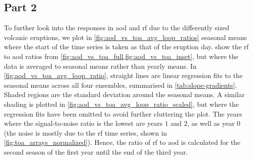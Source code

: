 \documentclass{ametsocV5}
\begin{document}

\subsection{Part 2}

To further look into the responses in \ac{aod} and \ac{rf} due to the differently sized
volcanic eruptions, we plot in \cref{fig:aod_vs_toa_avg_loop_ratios} seasonal means
where the start of the time series is taken as that of the eruption day.
 show the
\ac{rf} to \ac{aod} ratios from \cref{fig:aod_vs_toa_full,fig:aod_vs_toa_inset}, but
where the data is averaged to seasonal means rather than yearly means. In
\cref{fig:aod_vs_toa_avg_loop_ratio}, straight lines are linear regression fits to the
seasonal means across all four ensembles, summarised in \cref{tab:slope-gradients}.
Shaded regions are the standard deviation around the seasonal means. A similar shading
is plotted in \cref{fig:aod_vs_toa_avg_loop_ratio_scaled}, but where the regression fits
have been omitted to avoid further cluttering the plot. The years where the
signal-to-noise ratio is the lowest are years \(1\) and \(2\), as well as year \(0\)
(the noise is mostly due to the \ac{rf} time series, shown in
\cref{fig:toa_arrays_normalized}). Hence, the ratio of \ac{rf} to \ac{aod} is calculated
for the second season of the first year until the end of the third year.
\end{document}
